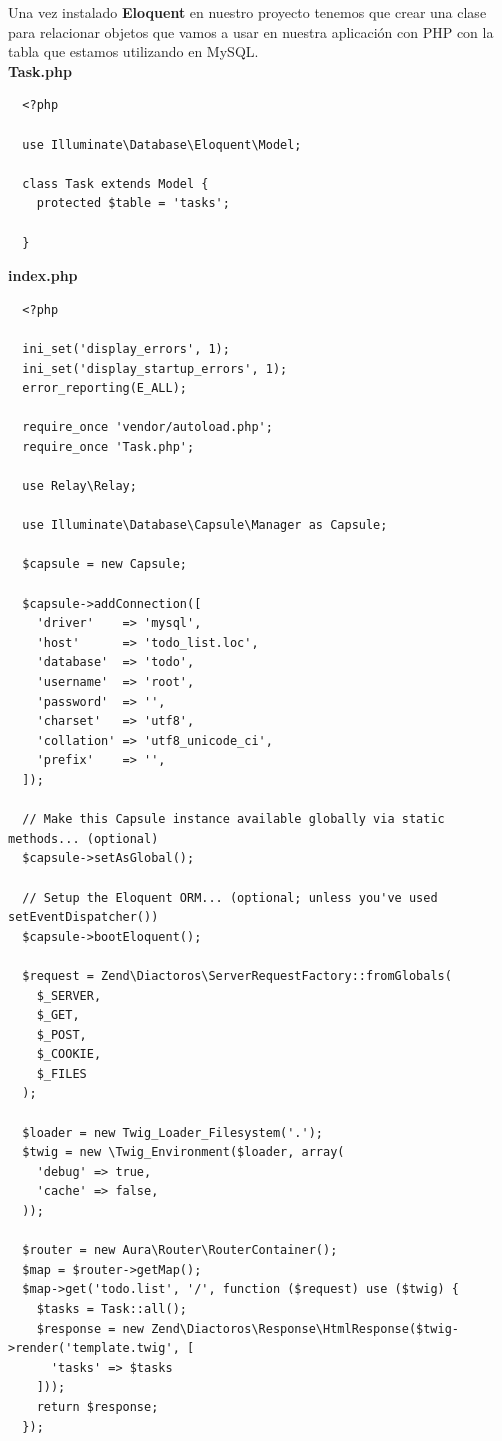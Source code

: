 \documentclass{article}
\begin{document}
Una vez instalado \textbf{Eloquent} en nuestro proyecto tenemos que crear una
clase para relacionar objetos que vamos a usar en nuestra aplicación con PHP
con la tabla que estamos utilizando en MySQL.\\

\textbf{Task.php}
\begin{verbatim}
  <?php

  use Illuminate\Database\Eloquent\Model;

  class Task extends Model {
    protected $table = 'tasks';

  }
\end{verbatim}

\textbf{index.php}
\begin{verbatim}
  <?php

  ini_set('display_errors', 1);
  ini_set('display_startup_errors', 1);
  error_reporting(E_ALL);

  require_once 'vendor/autoload.php';
  require_once 'Task.php';

  use Relay\Relay;

  use Illuminate\Database\Capsule\Manager as Capsule;

  $capsule = new Capsule;

  $capsule->addConnection([
    'driver'    => 'mysql',
    'host'      => 'todo_list.loc',
    'database'  => 'todo',
    'username'  => 'root',
    'password'  => '',
    'charset'   => 'utf8',
    'collation' => 'utf8_unicode_ci',
    'prefix'    => '',
  ]);

  // Make this Capsule instance available globally via static methods... (optional)
  $capsule->setAsGlobal();

  // Setup the Eloquent ORM... (optional; unless you've used setEventDispatcher())
  $capsule->bootEloquent();

  $request = Zend\Diactoros\ServerRequestFactory::fromGlobals(
    $_SERVER,
    $_GET,
    $_POST,
    $_COOKIE,
    $_FILES
  );

  $loader = new Twig_Loader_Filesystem('.');
  $twig = new \Twig_Environment($loader, array(
    'debug' => true,
    'cache' => false,
  ));

  $router = new Aura\Router\RouterContainer();
  $map = $router->getMap();
  $map->get('todo.list', '/', function ($request) use ($twig) {
    $tasks = Task::all();
    $response = new Zend\Diactoros\Response\HtmlResponse($twig->render('template.twig', [
      'tasks' => $tasks
    ]));
    return $response;
  });


\end{verbatim}
\end{document}
